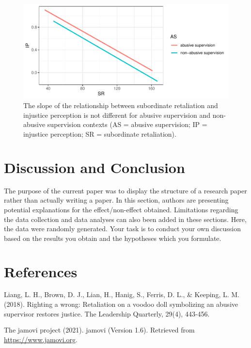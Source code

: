 \documentclass[
]{article}
\begin{document}
\begin{figure}
\centering
\includegraphics{voodoo_paper_dd_files/figure-latex/unnamed-chunk-2-1.pdf}
\caption{The slope of the relationship between subordinate retaliation
and injustice perception is not different for abusive supervision and
non-abusive supervision contexts (AS = abusive supervision; IP =
injustice perception; SR = subordinate retaliation).}
\end{figure}

\hypertarget{discussion-and-conclusion}{%
\section{Discussion and Conclusion}\label{discussion-and-conclusion}}

The purpose of the current paper was to display the structure of a
research paper rather than actually writing a paper. In this section,
authors are presenting potential explanations for the effect/non-effect
obtained. Limitations regarding the data collection and data analyses
can also been added in these sections. Here, the data were randomly
generated. Your task is to conduct your own discussion based on the
results you obtain and the hypotheses which you formulate.

\hypertarget{references}{%
\section{References}\label{references}}

Liang, L. H., Brown, D. J., Lian, H., Hanig, S., Ferris, D. L., \&
Keeping, L. M. (2018). Righting a wrong: Retaliation on a voodoo doll
symbolizing an abusive supervisor restores justice. The Leadership
Quarterly, 29(4), 443-456.

The jamovi project (2021). jamovi (Version 1.6). Retrieved from
\url{https://www.jamovi.org}.
\end{document}
